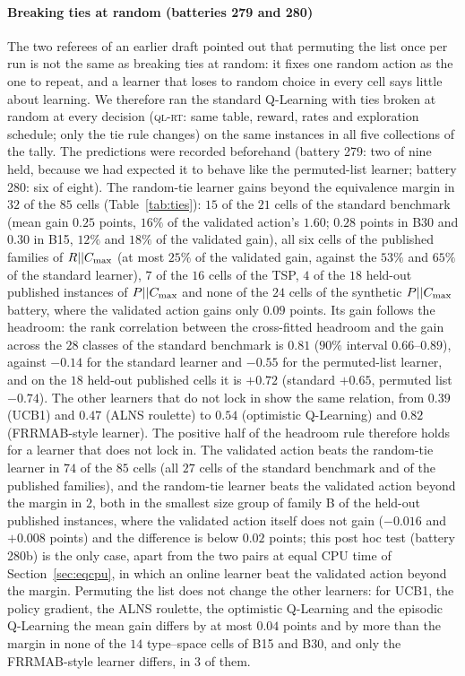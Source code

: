 \paragraph{Breaking ties at random (batteries 279 and 280)} The two referees of an earlier draft pointed out that permuting the list once per run is not the same as breaking ties at random: it fixes one random action as the one to repeat, and a learner that loses to random choice in every cell says little about learning. We therefore ran the standard Q-Learning with ties broken at random at every decision (\textsc{ql-rt}: same table, reward, rates and exploration schedule; only the tie rule changes) on the same instances in all five collections of the tally. The predictions were recorded beforehand (battery 279: two of nine held, because we had expected it to behave like the permuted-list learner; battery 280: six of eight). The random-tie learner gains beyond the equivalence margin in $32$ of the $85$ cells (Table~\ref{tab:ties}): $15$ of the $21$ cells of the standard benchmark (mean gain $0.25$ points, $16\%$ of the validated action's $1.60$; $0.28$ points in B30 and $0.30$ in B15, $12\%$ and $18\%$ of the validated gain), all six cells of the published families of $R||C_{\max}$ (at most $25\%$ of the validated gain, against the $53\%$ and $65\%$ of the standard learner), $7$ of the $16$ cells of the TSP, $4$ of the $18$ held-out published instances of $P||C_{\max}$ and none of the $24$ cells of the synthetic $P||C_{\max}$ battery, where the validated action gains only $0.09$ points. Its gain follows the headroom: the rank correlation between the cross-fitted headroom and the gain across the $28$ classes of the standard benchmark is $0.81$ ($90\%$ interval $0.66$--$0.89$), against $-0.14$ for the standard learner and $-0.55$ for the permuted-list learner, and on the $18$ held-out published cells it is $+0.72$ (standard $+0.65$, permuted list $-0.74$). The other learners that do not lock in show the same relation, from $0.39$ (UCB1) and $0.47$ (ALNS roulette) to $0.54$ (optimistic Q-Learning) and $0.82$ (FRRMAB-style learner). The positive half of the headroom rule therefore holds for a learner that does not lock in. The validated action beats the random-tie learner in $74$ of the $85$ cells (all $27$ cells of the standard benchmark and of the published families), and the random-tie learner beats the validated action beyond the margin in $2$, both in the smallest size group of family B of the held-out published instances, where the validated action itself does not gain ($-0.016$ and $+0.008$ points) and the difference is below $0.02$ points; this post hoc test (battery 280b) is the only case, apart from the two pairs at equal CPU time of Section~\ref{sec:eqcpu}, in which an online learner beat the validated action beyond the margin. Permuting the list does not change the other learners: for UCB1, the policy gradient, the ALNS roulette, the optimistic Q-Learning and the episodic Q-Learning the mean gain differs by at most $0.04$ points and by more than the margin in none of the $14$ type--space cells of B15 and B30, and only the FRRMAB-style learner differs, in $3$ of them.

